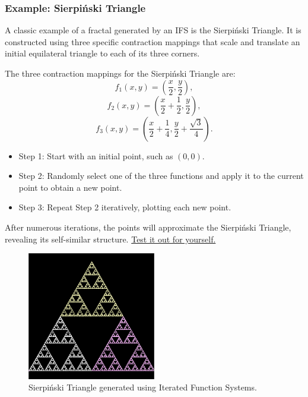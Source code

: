 \documentclass[12pt]{article}
\begin{document}
\subsubsection{Example: Sierpiński Triangle}
A classic example of a fractal generated by an IFS is the Sierpiński Triangle. It is constructed using three specific contraction mappings that scale and translate an initial equilateral triangle to each of its three corners.

The three contraction mappings for the Sierpiński Triangle are:
\[
f_1(x, y) = \left( \frac{x}{2}, \frac{y}{2} \right),
\]
\[
f_2(x, y) = \left( \frac{x}{2} + \frac{1}{2}, \frac{y}{2} \right),
\]
\[
f_3(x, y) = \left( \frac{x}{2} + \frac{1}{4}, \frac{y}{2} + \frac{\sqrt{3}}{4} \right).
\]

\begin{itemize}
    \item Step 1: Start with an initial point, such as \( (0,0) \).
    \item Step 2: Randomly select one of the three functions and apply it to the current point to obtain a new point.
    \item Step 3: Repeat Step 2 iteratively, plotting each new point.
\end{itemize}

After numerous iterations, the points will approximate the Sierpiński Triangle, revealing its self-similar structure. \href{https://cs.lmu.edu/~ray/notes/ifs/}{Test it out for yourself.}

\begin{figure}[h]
\centering
\includegraphics[width=0.5\textwidth]{assets/sierpinski-triangle.png}
\caption{Sierpiński Triangle generated using Iterated Function Systems.}
\label{fig:sierpinski}
\end{figure}
\end{document}
